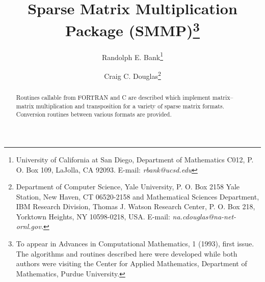 %
%
%
%
%
 

 
\title{Sparse Matrix Multiplication Package (SMMP)\thanks{%
            To appear in Advances in Computational Mathematics,
            1 (1993), first issue.
            The algorithms and routines described here were developed
            while both authors were visiting the Center for Applied
            Mathematics, Department of Mathematics, Purdue University.
            }
      }
\author{Randolph E. Bank\thanks{University of California at San Diego,
                Department of Mathematics C012, P. O. Box 109,
                LaJolla, CA 92093.
                E-mail:  {\it rbank@ucsd.edu}}
   \and 
        Craig C. Douglas\thanks{
                Department of Computer Science,
                Yale University,
                P. O. Box 2158 Yale Station,
                New Haven, CT 06520-2158
                and
                Mathematical Sciences Department,
                IBM Research Division,
                Thomas J. Watson Research Center,
                P. O. Box 218,
                Yorktown Heights, NY 10598-0218,
                USA.
                E-mail:  {\it na.cdouglas@na-net-ornl.gov.}}
       }



\maketitle
 
 
\begin{abstract}
Routines callable from FORTRAN and C are described which implement
matrix--matrix multiplication and transposition for a variety of sparse matrix
formats.
Conversion routines between various formats are provided.
\end{abstract}

